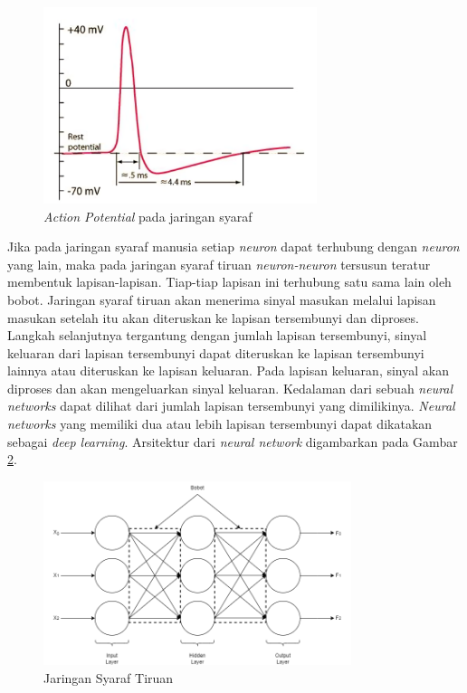 \begin{figure}[H]
    \centering
    \includegraphics[width=8cm]{contents/chapter-2/action potential.png}
    \caption{\textit{Action Potential} pada jaringan syaraf}
    \label{fig:action potential}
\end{figure}

Jika pada jaringan syaraf manusia setiap \textit{neuron} dapat terhubung dengan \textit{neuron} yang lain, maka pada jaringan syaraf tiruan \textit{neuron-neuron} tersusun teratur membentuk lapisan-lapisan\cite{Kelleher2019-cj}. Tiap-tiap lapisan ini terhubung satu sama lain oleh bobot. Jaringan syaraf tiruan akan menerima sinyal masukan melalui lapisan masukan setelah itu akan diteruskan ke lapisan tersembunyi dan diproses. Langkah selanjutnya tergantung dengan jumlah lapisan tersembunyi, sinyal keluaran dari lapisan tersembunyi dapat diteruskan ke lapisan tersembunyi lainnya atau diteruskan ke lapisan keluaran. Pada lapisan keluaran, sinyal akan diproses dan akan mengeluarkan sinyal keluaran. Kedalaman dari sebuah \textit{neural networks} dapat dilihat dari jumlah lapisan tersembunyi yang dimilikinya. \textit{Neural networks} yang memiliki dua atau lebih lapisan tersembunyi dapat dikatakan sebagai \textit{deep learning}\cite{Kelleher2019-cj}. Arsitektur dari \textit{neural network} digambarkan pada Gambar \ref{fig:2.2 Jaringan Syaraf Tiruan}. 

\begin{figure}[H]
    \centering
    \includegraphics[width = 9cm]{contents/chapter-2/Jaringan Syaraf tiruan.png}
    \caption{Jaringan Syaraf Tiruan}
    \label{fig:2.2 Jaringan Syaraf Tiruan}
\end{figure}

